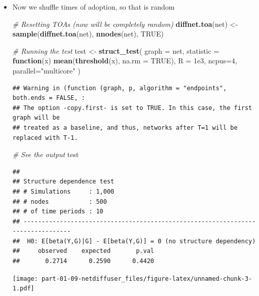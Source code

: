 \documentclass[
]{book}
\newenvironment{Shaded}{\begin{snugshade}}{\end{snugshade}}
\newcommand{\AttributeTok}[1]{\textcolor[rgb]{0.13,0.29,0.53}{#1}}
\newcommand{\CommentTok}[1]{\textcolor[rgb]{0.56,0.35,0.01}{\textit{#1}}}
\newcommand{\ConstantTok}[1]{\textcolor[rgb]{0.56,0.35,0.01}{#1}}
\newcommand{\ControlFlowTok}[1]{\textcolor[rgb]{0.13,0.29,0.53}{\textbf{#1}}}
\newcommand{\DecValTok}[1]{\textcolor[rgb]{0.00,0.00,0.81}{#1}}
\newcommand{\FloatTok}[1]{\textcolor[rgb]{0.00,0.00,0.81}{#1}}
\newcommand{\FunctionTok}[1]{\textcolor[rgb]{0.13,0.29,0.53}{\textbf{#1}}}
\newcommand{\NormalTok}[1]{#1}
\newcommand{\OtherTok}[1]{\textcolor[rgb]{0.56,0.35,0.01}{#1}}
\newcommand{\StringTok}[1]{\textcolor[rgb]{0.31,0.60,0.02}{#1}}
\begin{document}
\begin{itemize}
\item
  Now we shuffle times of adoption, so that is random

\begin{Shaded}
\begin{Highlighting}[]
\CommentTok{\# Resetting TOAs (now will be completely random)}
\FunctionTok{diffnet.toa}\NormalTok{(net) }\OtherTok{\textless{}{-}} \FunctionTok{sample}\NormalTok{(}\FunctionTok{diffnet.toa}\NormalTok{(net), }\FunctionTok{nnodes}\NormalTok{(net), }\ConstantTok{TRUE}\NormalTok{)}

\CommentTok{\# Running the test}
\NormalTok{test }\OtherTok{\textless{}{-}} \FunctionTok{struct\_test}\NormalTok{(}
  \AttributeTok{graph     =}\NormalTok{ net, }
  \AttributeTok{statistic =} \ControlFlowTok{function}\NormalTok{(x) }\FunctionTok{mean}\NormalTok{(}\FunctionTok{threshold}\NormalTok{(x), }\AttributeTok{na.rm =} \ConstantTok{TRUE}\NormalTok{),}
  \AttributeTok{R         =} \FloatTok{1e3}\NormalTok{,}
  \AttributeTok{ncpus=}\DecValTok{4}\NormalTok{, }\AttributeTok{parallel=}\StringTok{"multicore"}
\NormalTok{  )}
\end{Highlighting}
\end{Shaded}

\begin{verbatim}
## Warning in (function (graph, p, algorithm = "endpoints", both.ends = FALSE, :
## The option -copy.first- is set to TRUE. In this case, the first graph will be
## treated as a baseline, and thus, networks after T=1 will be replaced with T-1.
\end{verbatim}

\begin{Shaded}
\begin{Highlighting}[]
\CommentTok{\# See the output}
\NormalTok{test}
\end{Highlighting}
\end{Shaded}

\begin{verbatim}
## 
## Structure dependence test
## # Simulations     : 1,000
## # nodes           : 500
## # of time periods : 10
## --------------------------------------------------------------------------------
##  H0: E[beta(Y,G)|G] - E[beta(Y,G)] = 0 (no structure dependency)
##     observed    expected       p.val
##       0.2714      0.2590      0.4420
\end{verbatim}

  \texttt{[image: part-01-09-netdiffuser\_files/figure-latex/unnamed-chunk-3-1.pdf]}
\end{itemize}
\end{document}
